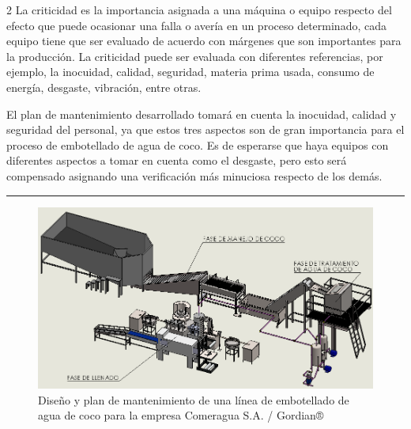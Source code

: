 \documentclass[11pt,spanish,Letterpaper,openany]{book}
\begin{document}
\begin {multicols}{2}
La criticidad es la importancia asignada a una máquina o equipo respecto del efecto que puede ocasionar una falla o avería en un proceso determinado, cada equipo tiene que ser evaluado de acuerdo con márgenes que son importantes para la producción. La criticidad puede ser evaluada con diferentes referencias, por ejemplo, la inocuidad, calidad, seguridad, materia prima usada, consumo de energía, desgaste, vibración, entre otras.

El plan de mantenimiento desarrollado tomará en cuenta la inocuidad, calidad y seguridad del personal, ya que estos tres aspectos son de gran importancia para el proceso de embotellado de agua de coco. Es de esperarse que haya equipos con diferentes aspectos a tomar en cuenta como el desgaste, pero esto será compensado asignando una verificación más minuciosa respecto de los demás.

\end {multicols}

\begin{center}\rule{0.5\linewidth}{\linethickness}\end{center}

\begin{figure}[H]

{\centering \includegraphics[width=1\linewidth]{images/201901-lcalmo-imagen03} 

}

\caption{Diseño y plan de mantenimiento de una línea de embotellado de agua de coco para la empresa Comeragua S.A. / Gordian®}\label{fig:unnamed-chunk-29}
\end{figure}
\end{document}
